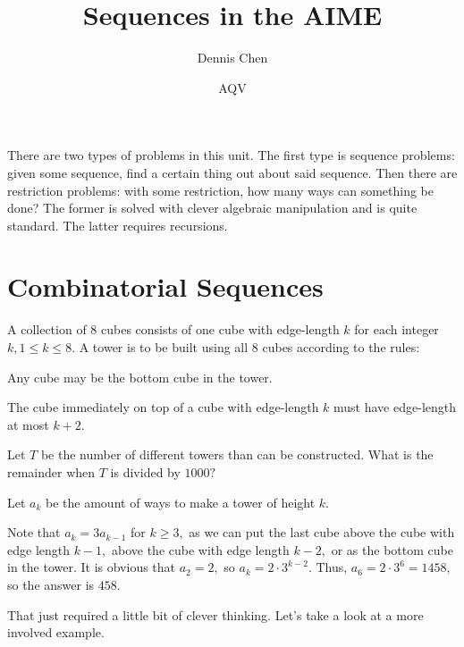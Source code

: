 \documentclass[mast]{lucky}
\title{Sequences in the AIME}
\author{Dennis Chen}
\date{AQV}
\begin{document}
\maketitle

There are two types of problems in this unit. The first type is sequence problems: given some sequence, find a certain thing out about said sequence. Then there are restriction problems: with some restriction, how many ways can something be done? The former is solved with clever algebraic manipulation and is quite standard. The latter requires recursions.

\section{Combinatorial Sequences}

\begin{exam}[AIME I 2006/11]
A collection of $8$ cubes consists of one cube with edge-length $k$ for each integer $k, 1 \le k \le 8.$ A tower is to be built using all $8$ cubes according to the rules:

\begin{itemize}

    \Item Any cube may be the bottom cube in the tower.

    \Item The cube immediately on top of a cube with edge-length $k$ must have edge-length at most $k+2.$

\end{itemize}

Let $T$ be the number of different towers than can be constructed. What is the remainder when $T$ is divided by $1000?$
\end{exam}
\begin{sol}
Let $a_k$ be the amount of ways to make a tower of height $k.$
    
Note that $a_k=3a_{k-1}$ for $k\geq 3,$ as we can put the last cube above the cube with edge length $k-1,$ above the cube with edge length $k-2,$ or as the bottom cube in the tower. It is obvious that $a_2=2,$ so $a_k=2\cdot 3^{k-2}.$ Thus, $a_6=2\cdot 3^6=1458,$ so the answer is $458.$
\end{sol}
That just required a little bit of clever thinking. Let's take a look at a more involved example.
\end{document}
